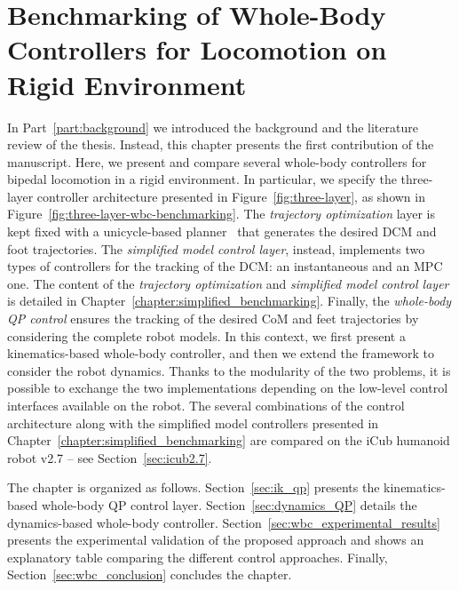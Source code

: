 \chapter{Benchmarking of Whole-Body Controllers for Locomotion on Rigid Environment\label{chapter:benchmarking_wbc}}

In Part~\ref{part:background} we introduced the background and the literature review of the thesis. Instead, this chapter presents the first contribution of the manuscript. 
Here, we present and compare several whole-body controllers for bipedal locomotion in a rigid environment. 
In particular, we specify the three-layer controller architecture presented in Figure~\ref{fig:three-layer}, as shown in Figure~\ref{fig:three-layer-wbc-benchmarking}. 
The \emph{trajectory optimization} layer is kept fixed with a unicycle-based planner~\citep{8594277} that generates the desired DCM and foot trajectories. The \emph{simplified model control layer}, instead, implements two types of controllers for the tracking of the DCM: an instantaneous and an MPC one. 
The content of the \emph{trajectory optimization} and \emph{simplified model control layer} is detailed in Chapter~\ref{chapter:simplified_benchmarking}. 
Finally, the \emph{whole-body QP control} ensures the tracking of the desired CoM and feet trajectories by considering the complete robot models. In this context, we first present a kinematics-based whole-body controller, and then we extend the framework to consider the robot dynamics. Thanks to the modularity of the two problems, it is possible to exchange the two implementations depending on the low-level control interfaces available on the robot. 
The several combinations of the control architecture along with the simplified model controllers presented in Chapter~\ref{chapter:simplified_benchmarking} are compared on the iCub humanoid robot v2.7 -- see Section~\ref{sec:icub2.7}.
\par 
The chapter is organized as follows. Section~\ref{sec:ik_qp} presents the kinematics-based whole-body QP control layer. Section~\ref{sec:dynamics_QP} details the dynamics-based whole-body controller. Section~\ref{sec:wbc_experimental_results} presents the experimental validation of the
proposed approach and shows an explanatory table comparing the different control approaches. Finally, Section~\ref{sec:wbc_conclusion} concludes the chapter.

